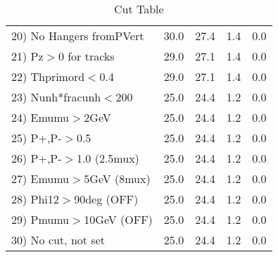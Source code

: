 \begin{table}[h!]
\begin{tabular}{||l||r|r|r|r||}
 20) No Hangers fromPVert &        30.0 &        27.4 &         1.4 &         0.0 \\
 21) Pz$>$0 for tracks    &        29.0 &        27.1 &         1.4 &         0.0 \\
 22) Thprimord$<$0.4      &        29.0 &        27.1 &         1.4 &         0.0 \\
 23) Nunh*fracunh$<$200   &        25.0 &        24.4 &         1.2 &         0.0 \\
 24) Emumu$>$2GeV         &        25.0 &        24.4 &         1.2 &         0.0 \\
 25) P+,P-$>$0.5          &        25.0 &        24.4 &         1.2 &         0.0 \\
 26) P+,P-$>$1.0 (2.5mux) &        25.0 &        24.4 &         1.2 &         0.0 \\
 27) Emumu$>$5GeV  (8mux) &        25.0 &        24.4 &         1.2 &         0.0 \\
 28) Phi12$>$90deg  (OFF) &        25.0 &        24.4 &         1.2 &         0.0 \\
 29) Pmumu$>$10GeV  (OFF) &        25.0 &        24.4 &         1.2 &         0.0 \\
 30) No cut, not set      &        25.0 &        24.4 &         1.2 &         0.0 \\
 \hline
 \hline
 \end{tabular}
 \caption{Cut Table \cohrp  }
 \label{tab-cut_crhop}
 \end{table}
